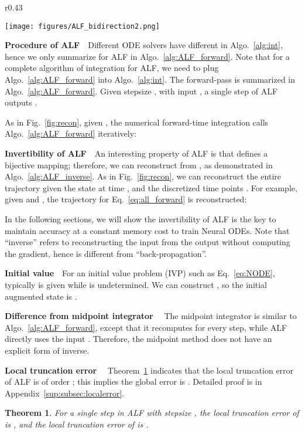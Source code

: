 \documentclass{article} \usepackage{iclr2021_conference,times}
\newtheorem{theorem}{Theorem}[section]
\begin{document}
\begin{wrapfigure}{r}{0.43\textwidth}
\begin{minipage}{\linewidth}
\centering
\texttt{[image: figures/ALF\_bidirection2.png]}
\vspace{-6mm}
\label{fig:recon}
\end{minipage}
\end{wrapfigure}

\textbf{Procedure of ALF}\ \ Different ODE solvers have different  in Algo.~\ref{alg:int}, hence we only summarize  for ALF in Algo.~\ref{alg:ALF_forward}. Note that for a complete algorithm of integration for ALF, we need to plug Algo.~\ref{alg:ALF_forward} into Algo.~\ref{alg:int}. The forward-pass is summarized in Algo.~\ref{alg:ALF_forward}. Given stepsize , with input , a single step of ALF outputs .

As in Fig.~\ref{fig:recon}, given , the numerical forward-time integration calls Algo.~\ref{alg:ALF_forward} iteratively:

\textbf{Invertibility of ALF}\ \ An interesting property of ALF is that  defines a bijective mapping; therefore, we can reconstruct  from , as demonstrated in Algo.~\ref{alg:ALF_inverse}. As in Fig.~\ref{fig:recon}, 
we can reconstruct the entire trajectory given the state  at time , and the discretized time points . For example, given  and , the trajectory for Eq.~\ref{eq:all_forward}
is reconstructed:

In the following sections, we will show the invertibility of ALF is the key to maintain accuracy at a constant memory cost to train Neural ODEs. 
Note that ``inverse'' refers to reconstructing the input from the output without computing the gradient, hence is different from ``back-propagation''. 

\textbf{Initial value}\ \  For an initial value problem (IVP) such as Eq.~\ref{eq:NODE}, typically  is given while  is undetermined. We can construct , so the initial augmented state is . 

\textbf{Difference from midpoint integrator} \ \ The midpoint integrator \citep{suli2003introduction} is similar to Algo.~\ref{alg:ALF_forward}, except that it recomputes  for every step, while ALF directly uses the input . Therefore, the midpoint method does not have an explicit form of inverse.

\textbf{Local truncation error} \ \  Theorem~\ref{theorem:truncation} indicates that the local truncation error of ALF is of order ; this implies the global error is . Detailed proof is in Appendix~\ref{sup:subsec:localerror}.
\begin{theorem}
\label{theorem:truncation}
For a single step in ALF with stepsize , the local truncation error of  is , and the local truncation error of  is .
\end{theorem}
\end{document}
